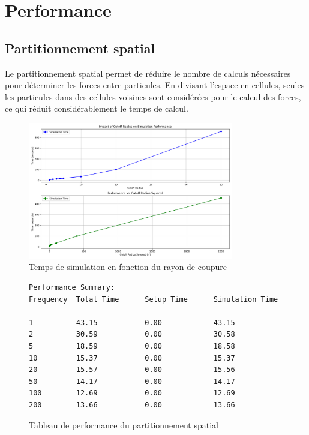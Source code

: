 \documentclass[12pt,a4paper]{article}
\begin{document}
\section{Performance}

\subsection{Partitionnement spatial}

Le partitionnement spatial permet de réduire le nombre de calculs nécessaires pour déterminer les forces entre particules. En divisant l'espace en cellules, seules les particules dans des cellules voisines sont considérées pour le calcul des forces, ce qui réduit considérablement le temps de calcul.

\begin{figure}[H]
\centering
\includegraphics[width=0.8\textwidth]{perf/cutoff_radius_performance.png}
\caption{Temps de simulation en fonction du rayon de coupure}
\end{figure}

\begin{figure}[H]
\centering
\begin{minipage}{\textwidth}
\begin{verbatim}
Performance Summary:
Frequency  Total Time      Setup Time      Simulation Time
-------------------------------------------------------
1          43.15           0.00            43.15          
2          30.59           0.00            30.58          
5          18.59           0.00            18.58          
10         15.37           0.00            15.37          
20         15.57           0.00            15.56          
50         14.17           0.00            14.17          
100        12.69           0.00            12.69          
200        13.66           0.00            13.66     
\end{verbatim}
\end{minipage}
\caption{Tableau de performance du partitionnement spatial}
\end{figure}
\end{document}
